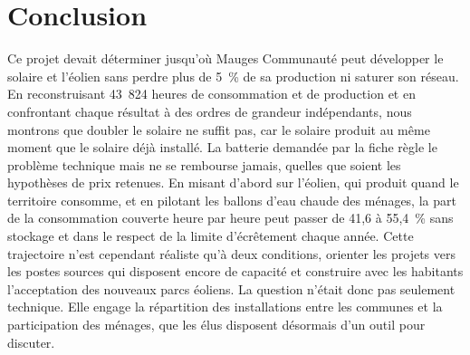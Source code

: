 \section{Conclusion}

Ce projet devait déterminer jusqu'où Mauges Communauté peut développer le solaire et l'éolien sans perdre plus de 5~\% de sa production ni saturer son réseau. En reconstruisant 43~824 heures de consommation et de production et en confrontant chaque résultat à des ordres de grandeur indépendants, nous montrons que doubler le solaire ne suffit pas, car le solaire produit au même moment que le solaire déjà installé. La batterie demandée par la fiche règle le problème technique mais ne se rembourse jamais, quelles que soient les hypothèses de prix retenues. En misant d'abord sur l'éolien, qui produit quand le territoire consomme, et en pilotant les ballons d'eau chaude des ménages, la part de la consommation couverte heure par heure peut passer de 41,6 à 55,4~\% sans stockage et dans le respect de la limite d'écrêtement chaque année. Cette trajectoire n'est cependant réaliste qu'à deux conditions, orienter les projets vers les postes sources qui disposent encore de capacité et construire avec les habitants l'acceptation des nouveaux parcs éoliens. La question n'était donc pas seulement technique. Elle engage la répartition des installations entre les communes et la participation des ménages, que les élus disposent désormais d'un outil pour discuter.
